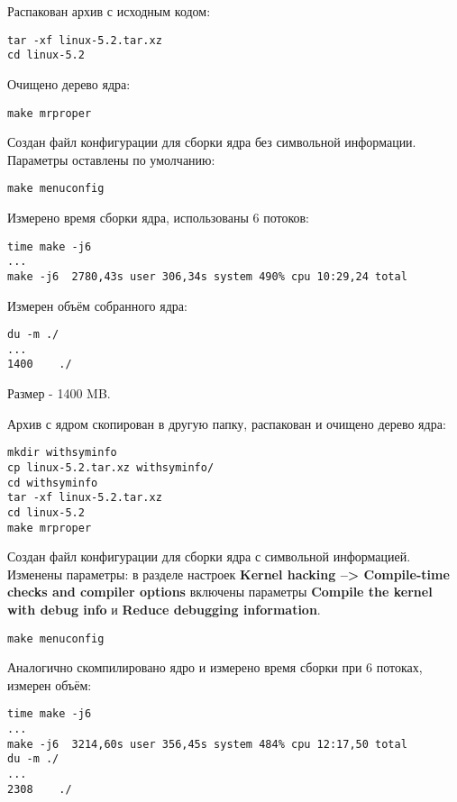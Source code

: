 \documentclass[a4paper,11pt]{article}
\begin{document}
    Распакован архив с исходным кодом:
    \begin{lstlisting}
tar -xf linux-5.2.tar.xz
cd linux-5.2
    \end{lstlisting}

    Очищено дерево ядра:
    \begin{lstlisting}
make mrproper
    \end{lstlisting}

    Создан файл конфигурации для сборки ядра без символьной информации. Параметры оставлены по умолчанию:
    \begin{lstlisting}
make menuconfig
    \end{lstlisting}

    Измерено время сборки ядра, использованы 6 потоков:
    \begin{lstlisting}
time make -j6
...
make -j6  2780,43s user 306,34s system 490% cpu 10:29,24 total
    \end{lstlisting}

    Измерен объём собранного ядра:
    \begin{lstlisting}
du -m ./
...
1400	./
    \end{lstlisting}

    Размер - 1400 MB.
    
    Архив с ядром скопирован в другую папку, распакован и очищено дерево ядра:
    \begin{lstlisting}
mkdir withsyminfo
cp linux-5.2.tar.xz withsyminfo/
cd withsyminfo
tar -xf linux-5.2.tar.xz
cd linux-5.2
make mrproper
    \end{lstlisting}

    Создан файл конфигурации для сборки ядра с символьной информацией.
    Изменены параметры: в разделе настроек \textbf{Kernel hacking --> Compile-time checks and compiler options} включены параметры
    \textbf{Compile the kernel with debug info} и \textbf{Reduce debugging information}.
    \begin{lstlisting}
make menuconfig
    \end{lstlisting}

    Аналогично скомпилировано ядро и измерено время сборки при 6 потоках, измерен объём:
    \begin{lstlisting}
time make -j6
...
make -j6  3214,60s user 356,45s system 484% cpu 12:17,50 total
du -m ./
...
2308	./
    \end{lstlisting}
\end{document}
